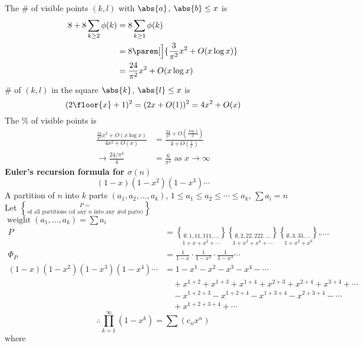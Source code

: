 The \# of visible points $(k,l)$ with $\abs{a}$, $\abs{b}\leq x$ is
\begin{align*}
8 + 8\sum_{k\geq2}\phi(k) &= 8\sum_{k\geq1}\phi(k) \\
&= 8\paren[\Big]{\frac{3}{\pi^2}x^2+O(x\log x)} \\
&= \frac{24}{\pi^2} x^2 + O(x\log x)
\end{align*}
\# of $(k,l)$ in the square $\abs{k}$, $\abs{l}\leq x$ is
\[ (2\floor{x}+1)^2 = (2x+O(1))^2 = 4x^2 + O(x) \]
The \% of visible points is
\begin{align*}
\frac{\frac{24}{\pi^2}x^2+O(x\log x)}{4x^2+O(x)} &= \frac{\frac{24}{\pi^2}+O(\frac{\log x}{x})}{4+O(\frac1x)} \\
\to\frac{24/\pi^2}{4} &= \frac{6}{\pi^2} \text{ as $x\to\infty$} 
\end{align*}
\textbf{Euler's recursion formula for $\sigma(n)$}
\[ (1-x)(1-x^2)(1-x^3)\dotsm \]
A partition of $n$ into $k$ parts $(a_1,a_2,\dotsc,a_k)$, $1\leq a_1\leq a_2\leq\dotsb\leq a_k$, $\sum a_i=n$ \\
Let $P=\brace{\text{of all partitions (of any $n$ into any \# of parts)}}$ \\
$\operatorname{weight}(a_1,\dotsc,a_k)=\sum a_i$
\begin{align*}
P &= \underset{1+x+x^2+\dotsb}{\brace{\emptyset,1,11,111,\dotsc}} \underset{1+x^2+x^4+\dotsb}{\brace{\emptyset,2,22,222,\dotsc}} \underset{1+x^3+x^6}{\brace{\emptyset,3,33,\dotsc}}, \dotsc \\
\Phi_P &= \frac{1}{1-x} \cdot \frac{1}{1-x^2} \cdot \frac{1}{1-x^3} \dotsm \\
(1-x)(1-x^2)(1-x^3)(1-x^4)\dotsm &= 1 - x^1 - x^2 - x^3 - x^4 - \dotsb \\
&\quad + x^{1+2} + x^{1+3} + x^{1+4} + x^{2+3} + x^{2+4} + x^{3+4} + \dotsb \\
&\quad - x^{1+2+3} - x^{1+2+4} - x^{1+3+4} - x^{2+3+4} - \dotsb \\
&\quad + x^{1+2+3+4} + \dotsb %
\end{align*}
\[ \therefore \prod_{k=1}^\infty (1-x^k) = \sum (c_n x^n) \]
where
